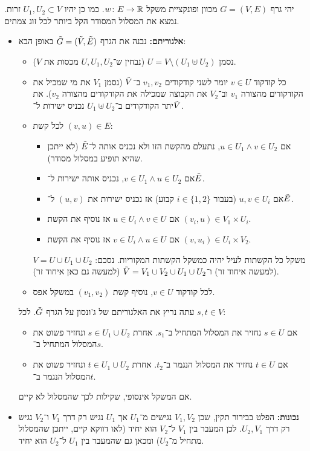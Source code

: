 \documentclass[]{../../../../tex/classes/homework}
\begin{document}
	\section{}
	יהי גרף $G =(V, E)$ מכוון ופונקציית משקל $w \colon E \to \mathbb{R}$. כמו כן יהיו $U_1, U_2 \subset V$ זרות. נמצא את המסלול המסודר הקל ביותר לכל זוג צמתים. 
	\begin{itemize}
		\item \textbf{אלגוריתם: }נבנה את הגרף $\tilde G = (\tilde V, \tilde E)$ באופן הבא:
		\begin{itemize}
			\item נסמן $U = V \setminus (U_1 \uplus U_2)$ (נבחין ש־$U, U_1, U_2$ מכסות את $V$). 
			\item כל קודקוד $v \in U$ יומר לשני קודקודים $v_1, v_2$ ב־$\tilde V$ (נסמן $V_1$ את מי שמכיל את הקודקודים מהצורה $v_1$ וב־$V_2$ את הקבוצה שמכילה את הקודקודים מהצורה $v_2$). את יתר הקודקודים ב־$U_1 \uplus U_2$ נכניס ישירות ל־$\tilde V$. 
			\item לכל קשת $(v, u) \in E$: 
			\begin{itemize}[*]
				\item אם $u \in U_1 \land v \in U_2$, נתעלם מהקשת הזו ולא נכניס אותה ל־$\tilde E$ (לא ייתכן שהיא תופיע במסלול מסודר). 
				\item אם $v \in U_1 \land u \in U_2$, נכניס אותה ישירות ל־$\tilde E$. 
				\item אם $u, v \in U_i$ (בעבור $i \in\{1, 2\}$ קבוע) אז נכניס ישירות את $(u, v)$ ל־$\tilde E$. 
				\item אם $u \in U_i \land v \in U$ אז נוסיף את הקשת $(v_i, u) \in V_1 \times U_i$. 
				\item אם $v \in U_i \land u \in U$ אז נוסיף את הקשת $(v, u_i) \in U_i \times V_2$. 
			\end{itemize}
			משקל כל הקשתות לעיל יהיה כמשקל הקשתות המקוריות. 
			נסכם: $V = U \cup U_1 \cup U_2$ (למעשה איחוד זר) ו־$\tilde V = V_1 \cup V_2 \cup U_1 \cup U_2$ (למעשה גם כאן איחוד זר). 
			\item לכל קודקוד $v \in U$, נוסיף קשת $(v_1, v_2)$ במשקל אפס. 
		\end{itemize}
		עתה נריץ את האלגוריתם של ג'ונסון על הגרף $\tilde G$. לכל $s, t \in V$: 
		\begin{itemize}
			\item אם $s \in U$ נחזיר את המסלול המתחיל ב־$s_1$. אחרת $s \in U_1 \cup U_2$ ונחזיר פשוט את המסלול המתחיל ב־$s$. 
			\item אם $t \in U$ נחזיר את המסלול הנגמר ב־$t_2$. אחרת $t \in U_1 \cup U_2$ ונחזיר פשוט את המסלול הנגמר ב־$t$. 
		\end{itemize}
		אם המשקל אינסופי, שקילות לכך שהמסלול לא קיים. 
		\item \textbf{נכונות: }הפלט בבירור תקין, שכן $V_1, V_2$ נגישים מ־$U_1$ אך $U_1$ נגיש רק דרך $V_1$ ו־$V_2$ נגיש רק דרך $U_2, V_1$. לכן המעבר בין $V_1$ ל־$V_2$ הוא יחיד (לאו דווקא קיים, ייתכן שהמסלול מתחיל מ־$U_2$) ומכאן גם שהמעבר בין $U_1$ ל־$U_2$ הוא יחיד.  
		

\end{itemize}
\end{document}

